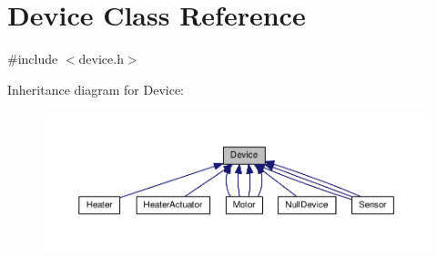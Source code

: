 \hypertarget{class_device}{}\section{Device Class Reference}
\label{class_device}


{\ttfamily \#include $<$device.\+h$>$}



Inheritance diagram for Device\+:\nopagebreak
\begin{figure}[H]
\begin{center}
\leavevmode
\includegraphics[width=350pt]{class_device__inherit__graph}
\end{center}
\end{figure}

